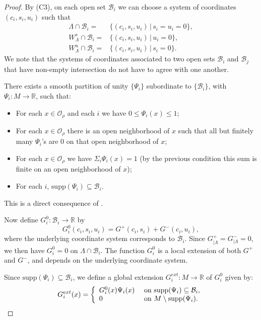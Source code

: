 \documentclass[11pt]{amsart}
\theoremstyle{definition}
\theoremstyle{remark}
\numberwithin{equation}{section}
\newcommand{\B}{\mathcal{B}}
\newcommand{\OO}{\mathcal{O}}
\begin{document}
\begin{proof}
By (C3), on each  open set $\B_i$ we can choose a system of coordinates $(c_i,s_i,u_i)$ such that
\begin{equation}\label{eqn:trivial_coords}
\begin{split}
\Lambda\cap\B_i      =&\{(c_i,s_i,u_i)\,|\, s_i=u_i=0\},\\
W^s_\Lambda\cap\B_i =&\{(c_i,s_i,u_i)\,|\, u_i=0\}, \\
W^u_\Lambda\cap\B_i  =&\{(c_i,s_i,u_i)\,|\, s_i=0\}.
\end{split}
\end{equation}
We note that the  systems of coordinates associated to two open sets $\B_i$ and $\B_j$ that have non-empty intersection do not have to agree with one another.


There exists a smooth partition of unity $\{\Psi_i\}$ subordinate to $\{\B_i\}$, with $\Psi_i:M\to\mathbb{R}$,  such that:
\begin{itemize}
\item
For each $x\in \OO_\rho$ and each $i$ we have $0\le \Psi_i(x)\le 1$;
\item
For each $x\in \OO_\rho$ there is an open neighborhood of  $x$ such that all but finitely many $\Psi_i$'s are $0$ on that open neighborhood of $x$;
\item
For each $x\in \OO_\rho$  we have $\Sigma_i\Psi_i(x)=1$ (by the previous condition this sum is finite on an open neighborhood of $x$);
\item
For each $i$, $\textrm{supp}(\Psi_i)\subseteq \B_i$.
\end{itemize}
This is a direct consequence of \cite[Theorem 3-11]{Spivak}.



Now define $G^0_i: \B_i\to\mathbb{R}$ by
\[
G^{0}_i(c_i,s_i,u_i)= G^+(c_i,s_i)+G^-(c_i,u_i),
\]
where the underlying coordinate system  corresponds to $\B_i$.
Since $G^+_{\mid\Lambda}=G^-_{\mid\Lambda}=0$, we then have $G^0_i=0$ on $\Lambda\cap\B_i$.
The function $G^0_i$ is a local extension of both $G^+$ and $G^-$, and depends on the underlying coordinate system.

Since $\textrm{supp}(\Psi_i)\subseteq \B_i$, we define a global extension $G^{ext}_i:M\to \mathbb{R}$ of $G^0_i$ given by:
\begin{equation*}
G^{ext}_i(x)= \left\{
\begin{array}{ll}
           G^0_i(x)\Psi_i(x)  & \hbox{ on $\textrm{supp}(\Psi_i)\subseteq \B_i$},\\
           0& \hbox{ on $ M\setminus \textrm{supp}(\Psi_i)$}.
\end{array}
\right.
\end{equation*}


\end{proof}
\end{document}
